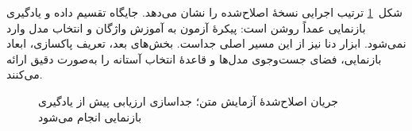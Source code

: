 شکل~\ref{fig:nlp-workflow-corrected} ترتیب اجرایی نسخۀ اصلاح‌شده را نشان می‌دهد. جایگاه تقسیم داده و یادگیری بازنمایی عمداً روشن است: پیکرۀ آزمون به آموزش واژگان و انتخاب مدل وارد نمی‌شود. ابزار دنا نیز از این مسیر اصلی جداست. بخش‌های بعد، تعریف پاکسازی، ابعاد بازنمایی، فضای جست‌وجوی مدل‌ها و قاعدۀ انتخاب آستانه را به‌صورت دقیق ارائه می‌کنند.

\begin{figure}[p]
\centering

\caption{جریان اصلاح‌شدۀ آزمایش متن؛ جداسازی ارزیابی پیش از یادگیری بازنمایی انجام می‌شود}
\label{fig:nlp-workflow-corrected}
\end{figure}
